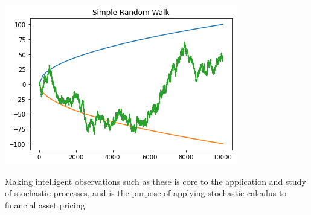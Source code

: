 \documentclass{article}
\begin{document}
\begin{center}
    \includegraphics[scale=0.5]{images/SRR.png}
\end{center}
Making intelligent observations such as these is core to the application and study of stochastic processes, and is the purpose of applying stochastic calculus to financial asset pricing.
\end{document}
